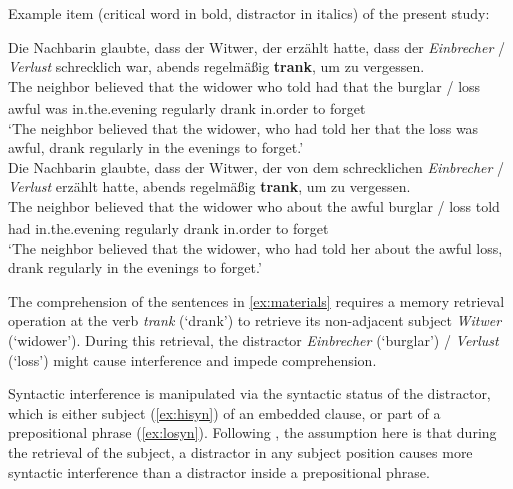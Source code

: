 \documentclass[a4paper, man, floatsintext]{apa7}
\begin{document}
\begin{exe}  
\ex \label{ex:materials} Example item (critical word in bold, distractor in italics) of the present study:
    \begin{xlist}   
    \label{ex:hisyn} 
    \gll Die  Nachbarin glaubte,	dass	der Witwer,  der  erzählt hatte, dass der \textit{Einbrecher} / \textit{Verlust}  schrecklich war, abends regelmäßig \textbf{trank}, um zu vergessen.\\ 
    The\textsubscript{} neighbor\textsubscript{} believed that the widower who told had that the burglar / loss awful was in.the.evening regularly drank in.order to forget \\
    \trans `The neighbor believed that the widower, who had told her that the loss was awful, drank regularly in the evenings to forget.' \\
    
    \label{ex:losyn} 
    \gll Die  Nachbarin glaubte, dass der Witwer,  der  von    dem schrecklichen \textit{Einbrecher} / \textit{Verlust} erzählt hatte, abends regelmäßig \textbf{trank}, um zu vergessen. \\ 
    The\textsubscript{} neighbor\textsubscript{} believed that the widower who about the awful burglar / loss told had in.the.evening regularly drank in.order to forget\\
    \trans `The neighbor believed that the widower, who had told her about the awful loss, drank regularly in the evenings to forget.'  \\
    \end{xlist}
\end{exe}

The comprehension of the sentences in \ref{ex:materials} requires a memory retrieval operation at the verb \textit{trank} (`drank') to retrieve its non-adjacent subject \textit{Witwer} (`widower'). During this retrieval, the distractor \textit{Einbrecher} (`burglar') / \textit{Verlust} (`loss') might cause interference and impede comprehension. 

Syntactic interference is manipulated via the syntactic status of the distractor, which is either subject (\ref{ex:hisyn}) of an embedded clause, or part of a prepositional phrase (\ref{ex:losyn}). Following \cite{vandyke07}, the assumption here is that  during the retrieval of the subject, a distractor in any subject position causes more syntactic interference than a distractor inside a prepositional phrase. 
\end{document}
